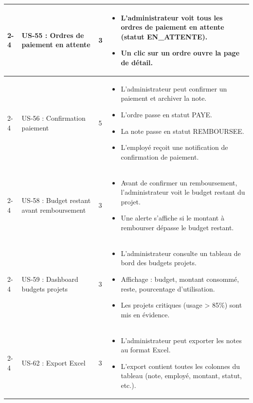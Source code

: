 \documentclass[12pt,a4paper]{report}
\begin{document}
\begin{longtable}{|p{2.5cm}|p{3cm}|p{1.5cm}|p{8cm}|}
\cline{2-4}
& US-55 : Ordres de paiement en attente & 3 & \begin{itemize}
 \item L’administrateur voit tous les ordres de paiement en attente (statut EN\_ATTENTE).
 \item Un clic sur un ordre ouvre la page de détail.
\end{itemize} \\
\cline{2-4}
& US-56 : Confirmation paiement & 5 & \begin{itemize}
 \item L’administrateur peut confirmer un paiement et archiver la note.
 \item L’ordre passe en statut PAYE.
 \item La note passe en statut REMBOURSEE.
 \item L’employé reçoit une notification de confirmation de paiement.
\end{itemize} \\
\cline{2-4}
& US-58 : Budget restant avant remboursement & 3 & \begin{itemize}
 \item Avant de confirmer un remboursement, l’administrateur voit le budget restant du projet.
 \item Une alerte s’affiche si le montant à rembourser dépasse le budget restant.
\end{itemize} \\
\cline{2-4}
& US-59 : Dashboard budgets projets & 3 & \begin{itemize}
 \item L’administrateur consulte un tableau de bord des budgets projets.
 \item Affichage : budget, montant consommé, reste, pourcentage d’utilisation.
 \item Les projets critiques (usage > 85\%) sont mis en évidence.
\end{itemize} \\
\cline{2-4}
& US-62 : Export Excel & 3 & \begin{itemize}
 \item L’administrateur peut exporter les notes au format Excel.
 \item L’export contient toutes les colonnes du tableau (note, employé, montant, statut, etc.).
\end{itemize} \\
\hline


\end{longtable}
\end{document}
